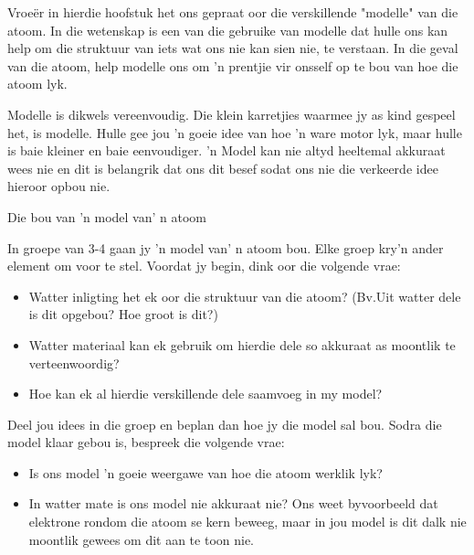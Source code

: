             \label{m38741*id260472}Vroe\"{e}r in hierdie hoofstuk het ons gepraat oor die verskillende "modelle" van die atoom. In die wetenskap is een van die gebruike van modelle dat hulle ons kan help om die struktuur van iets wat ons nie kan sien nie, te verstaan. In die geval van die atoom, help modelle ons om 'n prentjie vir onsself op te bou van hoe die atoom lyk.\par 
        \label{m38741*id260480}Modelle is dikwels vereenvoudig. Die klein karretjies waarmee jy as kind gespeel het, is modelle. Hulle gee jou 'n goeie idee van hoe 'n ware motor lyk, maar hulle is baie kleiner en baie eenvoudiger. 'n Model kan nie altyd heeltemal akkuraat wees nie en dit is belangrik dat ons dit besef sodat ons nie die verkeerde idee hieroor opbou nie.\par 
\begin{groupdiscussion}{Die bou van 'n model van' n atoom}
            \nopagebreak
\begin{multicols}{2}
        \label{m38741*id260488}In groepe van 3-4 gaan jy 'n model van' n atoom bou. Elke groep kry'n ander element om voor te stel. Voordat jy begin, dink oor die volgende vrae:\par 
        \label{m38741*id260495}\begin{itemize}[noitemsep]
            \label{m38741*uid114}\item Watter inligting het ek oor die struktuur van die atoom? (Bv.Uit watter dele is dit opgebou? Hoe groot is dit?)
\label{m38741*uid115}\item Watter materiaal kan ek gebruik om hierdie dele so akkuraat as moontlik te verteenwoordig?
\label{m38741*uid116}\item Hoe kan ek al hierdie verskillende dele saamvoeg in my model?
\end{itemize}
        \label{m38741*id260537}Deel jou idees in die groep en beplan dan hoe jy die model sal bou. Sodra die model klaar gebou is, bespreek die volgende vrae:\par 
        \label{m38741*id260542}\begin{itemize}[noitemsep]
            \label{m38741*uid117}\item Is ons model 'n goeie weergawe van hoe die atoom werklik lyk?
\label{m38741*uid118}\item In watter mate is ons model nie akkuraat nie? Ons weet byvoorbeeld dat elektrone rondom die atoom se kern beweeg, maar in jou model is dit dalk nie moontlik gewees om dit aan te toon nie.

\end{itemize}
\end{multicols}
\end{groupdiscussion}
